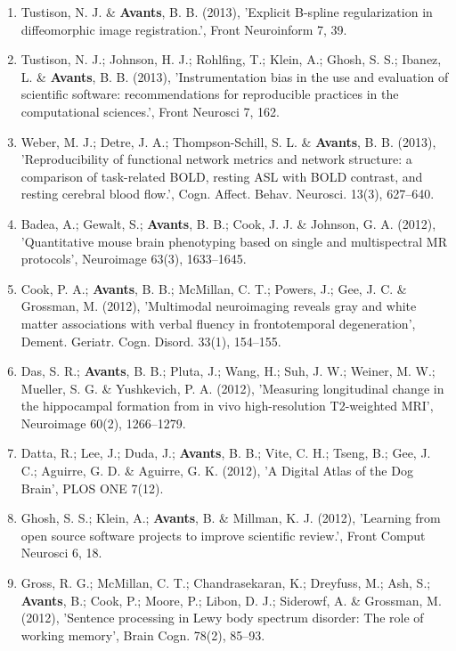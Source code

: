 \documentclass[11pt]{moderncv} %
\begin{document}
\begin{enumerate}
\item  Tustison, N. J. \&  \textbf{Avants}, B. B. (2013), 'Explicit B-spline regularization in diffeomorphic image registration.', Front Neuroinform 7, 39.

\item  Tustison, N. J.; Johnson, H. J.; Rohlfing, T.; Klein, A.; Ghosh, S. S.; Ibanez, L. \&  \textbf{Avants}, B. B. (2013), 'Instrumentation bias in the use and evaluation of scientific software: recommendations for reproducible practices in the computational sciences.', Front Neurosci 7, 162.

\item  Weber, M. J.; Detre, J. A.; Thompson-Schill, S. L. \&  \textbf{Avants}, B. B. (2013), 'Reproducibility of functional network metrics and network structure: a comparison of task-related BOLD, resting ASL with BOLD contrast, and resting cerebral blood flow.', Cogn. Affect. Behav. Neurosci. 13(3), 627--640.

\item  Badea, A.; Gewalt, S.; \textbf{Avants}, B. B.; Cook, J. J. \&  Johnson, G. A. (2012), 'Quantitative mouse brain phenotyping based on single and multispectral MR protocols', Neuroimage 63(3), 1633--1645.

\item  Cook, P. A.; \textbf{Avants}, B. B.; McMillan, C. T.; Powers, J.; Gee, J. C. \&  Grossman, M. (2012), 'Multimodal neuroimaging reveals gray and white matter associations with verbal fluency in frontotemporal degeneration', Dement. Geriatr. Cogn. Disord. 33(1), 154--155.

\item  Das, S. R.; \textbf{Avants}, B. B.; Pluta, J.; Wang, H.; Suh, J. W.; Weiner, M. W.; Mueller, S. G. \&  Yushkevich, P. A. (2012), 'Measuring longitudinal change in the hippocampal formation from in vivo high-resolution T2-weighted MRI', Neuroimage 60(2), 1266--1279.

\item  Datta, R.; Lee, J.; Duda, J.; \textbf{Avants}, B. B.; Vite, C. H.; Tseng, B.; Gee, J. C.; Aguirre, G. D. \&  Aguirre, G. K. (2012), 'A Digital Atlas of the Dog Brain', PLOS ONE 7(12).

\item  Ghosh, S. S.; Klein, A.; \textbf{Avants}, B. \&  Millman, K. J. (2012), 'Learning from open source software projects to improve scientific review.', Front Comput Neurosci 6, 18.

\item  Gross, R. G.; McMillan, C. T.; Chandrasekaran, K.; Dreyfuss, M.; Ash, S.; \textbf{Avants}, B.; Cook, P.; Moore, P.; Libon, D. J.; Siderowf, A. \&  Grossman, M. (2012), 'Sentence processing in Lewy body spectrum disorder: The role of working memory', Brain Cogn. 78(2), 85--93.


\end{enumerate}
\end{document}
